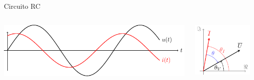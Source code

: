 \documentclass[aspectratio=169, xcolor={usenames,svgnames,dvipsnames}]{beamer}
\begin{document}
\begin{frame}{Circuito RC}
\begin{columns}
\begin{column}{0.7\columnwidth}
\begin{center}
\includegraphics[width=\linewidth]{../figs/capacitivo.pdf}
\end{center}
\end{column}
\begin{column}{0.25\columnwidth}
\begin{center}
\includegraphics[width=\linewidth]{../figs/fasorCondensadorReal_VI.pdf}
\end{center}
\end{column}
\end{columns}


\end{frame}
\end{document}
